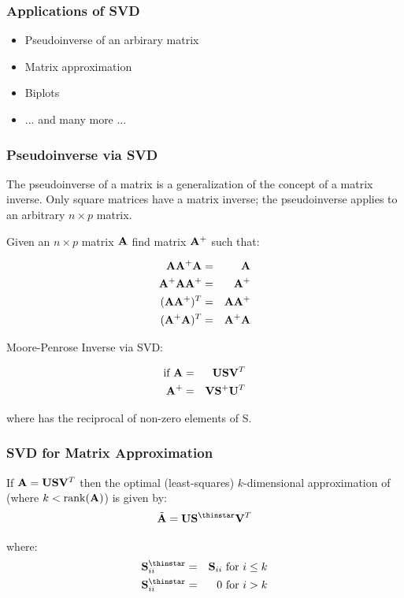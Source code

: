 \documentclass{beamer}
\DeclareMathOperator{\rank}{rank}
\begin{document}
\begin{frame}
  \frametitle{Applications of SVD}

\begin{itemize}
\item Pseudoinverse of an arbirary matrix
\item Matrix approximation
\item Biplots
\item ... and many more ...
\end{itemize}

\end{frame}


\begin{frame}
  \frametitle{Pseudoinverse via SVD}

The pseudoinverse of a matrix is a generalization of the concept of a matrix inverse. Only square matrices have a matrix inverse; the pseudoinverse applies to an arbitrary $n \times p$ matrix.

\smallskip
Given an $n \times p$ matrix $\mathbf{A}$ find matrix $\mathbf{A}^{+}$ such that:

\begin{eqnarray*}
\mathbf{A} \mathbf{A}^{+} \mathbf{A} & = & \mathbf{A} \\
\mathbf{A}^{+} \mathbf{A} \mathbf{A}^{+} & = & \mathbf{A}^{+}\\
(\mathbf{A} \mathbf{A}^{+})^T & = & \mathbf{A} \mathbf{A}^{+}\\
(\mathbf{A}^{+} \mathbf{A})^T & = & \mathbf{A}^{+} \mathbf{A}
\end{eqnarray*}

\smallskip
Moore-Penrose Inverse via SVD:

\begin{eqnarray*}
\text{if}\ \mathbf{A} &=& \mathbf{U}\mathbf{S}\mathbf{V}^T \\
\mathbf{A}^{+} &=& \mathbf{V} \mathbf{S}^{+}  \mathbf{U}^T
\end{eqnarray*}

where  has the reciprocal of non-zero elements of S.

\end{frame}

\begin{frame}
  \frametitle{SVD for Matrix Approximation}

If $ \mathbf{A} = \mathbf{U} \mathbf{S} \mathbf{V}^T $
then the optimal (least-squares) $k$-dimensional approximation of  (where $ k < \rank(\Mtx{A})$) is given by:
\[
\tilde{\Mtx{A}} = \Mtx{U}\Mtx{S}^{\thinstar} \Mtx{V}^T
\]

where:
\begin{eqnarray*}
\Mtx{S}_{ii}^{\thinstar} &=& \Mtx{S}_{ii} \text{ for } i \leq k\\
\Mtx{S}_{ii}^{\thinstar} &=& 0 \text{ for } i > k\\
\end{eqnarray*}

\end{frame}
\end{document}
